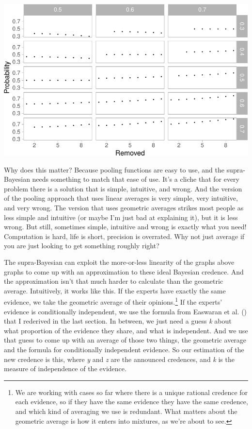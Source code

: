 \documentclass[
  10pt,
  letterpaper,
  DIV=11,
  numbers=noendperiod,
  twoside]{scrartcl}
\begin{document}
\includegraphics{mixing-expert-opinion_files/figure-pdf/unnamed-chunk-4-1.pdf}

Why does this matter? Because pooling functions are easy to use, and the
supra-Bayesian needs something to match that ease of use. It's a cliche
that for every problem there is a solution that is simple, intuitive,
and wrong. And the version of the pooling approach that uses linear
averages is very simple, very intuitive, and very wrong. The version
that uses geometric averages strikes most people as less simple and
intuitive (or maybe I'm just bad at explaining it), but it is less
wrong. But still, sometimes simple, intuitive and wrong is exactly what
you need! Computation is hard, life is short, precision is overrated.
Why not just average if you are just looking to get something roughly
right?

The supra-Bayesian can exploit the more-or-less linearity of the graphs
above graphs to come up with an approximation to these ideal Bayesian
credence. And the approximation isn't that much harder to calculate than
the geometric average. Intuitively, it works like this. If the experts
have exactly the same evidence, we take the geometric average of their
opinions.\footnote{We are working with cases so far where there is a
  unique rational credence for each evidence, so if they have the same
  evidence they have the same credence, and which kind of averaging we
  use is redundant. What matters about the geometric average is how it
  enters into mixtures, as we're about to see.} If the experts' evidence
is conditionally independent, we use the formula from Easwaran et al.
() that I rederived in the last
section. In between, we just need a guess \emph{k} about what proportion
of the evidence they share, and what is independent. And we use that
guess to come up with an average of those two things, the geometric
average and the formula for conditionally independent evidence. So our
estimation of the new credence is this, where \emph{y} and \emph{z} are
the announced credences, and \emph{k} is the measure of independence of
the evidence.
\end{document}
